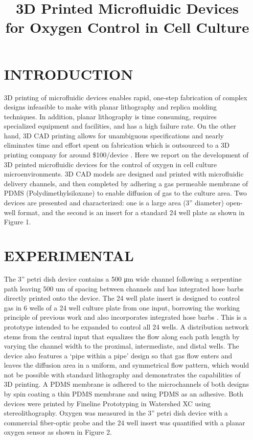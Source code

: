 \documentclass{article}
\title{3D Printed Microfluidic Devices for Oxygen Control in Cell Culture}
\begin{document}
\maketitle

\section{INTRODUCTION}

3D printing of microfluidic devices enables rapid, one-step fabrication of complex designs infeasible to make with planar lithography and replica molding techniques. In addition, planar lithography is time consuming, requires specialized equipment and facilities, and has a high failure rate. On the other hand, 3D CAD printing allows for unambiguous specifications and nearly eliminates time and effort spent on fabrication which is outsourced to a 3D printing company for around \$100/device \cite{Au2014, Chen2014}. Here we report on the development of 3D printed microfluidic devices for the control of oxygen in cell culture microenvironments. 3D CAD models are designed and printed with microfluidic delivery channels, and then completed by adhering a gas permeable membrane of PDMS (Polydimethylsiloxane) to enable diffusion of gas to the culture area. Two devices are presented and characterized: one is a large area (3” diameter) open-well format, and the second is an insert for a standard 24 well plate as shown in Figure 1. 

\section{EXPERIMENTAL}

The 3” petri dish device contains a 500 μm wide channel following a serpentine path leaving 500 um of spacing between channels and has integrated hose barbs directly printed onto the device. The 24 well plate insert is designed to control gas in 6 wells of a 24 well culture plate from one input, borrowing the working principle of previous work and also incorporates integrated hose barbs \cite{Oppegard2010}. This is a prototype intended to be expanded to control all 24 wells. A distribution network stems from the central input that equalizes the flow along each path length by varying the channel width to the proximal, intermediate, and distal wells. The device also features a ‘pipe within a pipe’ design so that gas flow enters and leaves the diffusion area in a uniform, and symmetrical flow pattern, which would not be possible with standard lithography and demonstrates the capabilities of 3D printing. A PDMS membrane is adhered to the microchannels of both designs by spin coating a thin PDMS membrane and using PDMS as an adhesive. Both devices were printed by Fineline Prototyping in Watershed XC using stereolithography. Oxygen was measured in the 3” petri dish device with a commercial fiber-optic probe and the 24 well insert was quantified with a planar oxygen sensor as shown in Figure 2. 
\end{document}
